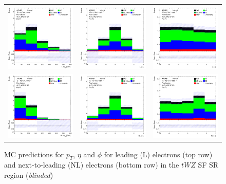 \begin{figure}[htbp]
  \centering
  \begin{tabular}{ccc}


    \includegraphics[width=.2\textwidth]{figures/PreFitPlots/lep4_tWZ_4T_SF_L_el_pt} &
    \includegraphics[width=.2\textwidth]{figures/PreFitPlots/lep4_tWZ_4T_SF_L_el_eta} &
    \includegraphics[width=.2\textwidth]{figures/PreFitPlots/lep4_tWZ_4T_SF_L_el_phi} \\
    \includegraphics[width=.2\textwidth]{figures/PreFitPlots/lep4_tWZ_4T_SF_NL_el_pt} &
    \includegraphics[width=.2\textwidth]{figures/PreFitPlots/lep4_tWZ_4T_SF_NL_el_eta} &
    \includegraphics[width=.2\textwidth]{figures/PreFitPlots/lep4_tWZ_4T_SF_NL_el_phi} \\

  \end{tabular}
    \caption{MC predictions for $p_{T}$, $\eta$ and $\phi$ for leading (L) electrons (top row) and next-to-leading (NL) electrons (bottom row) in the $tWZ$ SF SR region (\textit{blinded})}
  \label{fig:4lep-SF-SR-electronPlots}
\end{figure}


